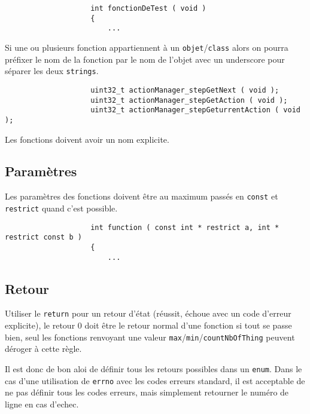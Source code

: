 			\begin{cbox}{}
				\begin{verbatim}
					int fonctionDeTest ( void )
					{
					    ...
				\end{verbatim}
			\end{cbox}

			Si une ou plusieurs fonction appartiennent à un \verb+objet+/\verb+class+ alors on pourra préfixer le nom de la fonction par le nom de l'objet avec un underscore pour séparer les deux \verb+strings+.

			\begin{cbox}{}
				\begin{verbatim}
					uint32_t actionManager_stepGetNext ( void );
					uint32_t actionManager_stepGetAction ( void );
					uint32_t actionManager_stepGeturrentAction ( void );
				\end{verbatim}
			\end{cbox}

			Les fonctions doivent avoir un nom explicite.

		\subsection{Paramètres}
			Les paramètres des fonctions doivent être au maximum passés en \verb+const+ et \verb+restrict+ quand c'est possible. 

			\begin{cbox}{}
				\begin{verbatim}
					int function ( const int * restrict a, int * restrict const b )
					{
					    ...
				\end{verbatim}
			\end{cbox}

		\subsection{Retour}
			Utiliser le \verb+return+ pour un retour d'état (réussit, échoue avec un code d'erreur explicite), le retour 0 doit être le retour normal d'une fonction si tout se passe bien, seul les fonctions renvoyant une valeur \verb+max+/\verb+min+/\verb+countNbOfThing+ peuvent déroger à cette règle.

			Il est donc de bon aloi de définir tous les retours possibles dans un \verb+enum+. Dans le cas d'une utilisation de \verb+errno+ avec les codes erreurs standard, il est acceptable de ne pas définir tous les codes erreurs, mais simplement retourner le numéro de ligne en cas d'echec.

